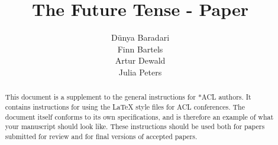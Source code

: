 \documentclass[11pt]{article}
\title{The Future Tense - Paper}
\author{Dünya Baradari\\\And
  Finn Bartels \\\And
  Artur Dewald \\\And
  Julia Peters}
\begin{document}
\maketitle
\begin{abstract}
This document is a supplement to the general instructions for *ACL authors.
It contains instructions for using the \LaTeX{} style files for ACL conferences.
The document itself conforms to its own specifications, and is therefore an example of what your manuscript should look like.
These instructions should be used both for papers submitted for review and for final versions of accepted papers.
\end{abstract}










\appendix
\end{document}
